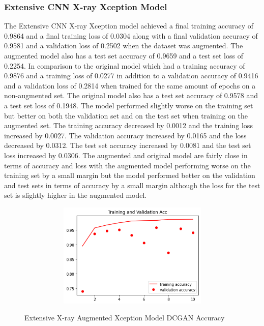 \subsubsection{Extensive CNN X-ray Xception Model}
The Extensive CNN X-ray Xception model achieved a final training accuracy of 0.9864 and a final training loss of 0.0304 along with a final validation accuracy of 0.9581 and a validation loss of 0.2502 when the dataset was augmented.  The augmented model also has a test set accuracy of 0.9659 and a test set loss of 0.2254.  In comparison to the original model which had a training accuracy of 0.9876 and a training loss of 0.0277 in addition to a validation accuracy of 0.9416 and a validation loss of 0.2814 when trained for the same amount of epochs on a non-augmented set.  The original model also has a test set accuracy of 0.9578 and a test set loss of 0.1948.  The model performed slightly worse on the training set but better on both the validation set and on the test set when training on the augmented set.  The training accuracy decreased by 0.0012 and the training loss increased by 0.0027. The validation accuracy increased by 0.0165 and the loss decreased by 0.0312.  The test set accuracy increased by 0.0081 and the test set loss increased by 0.0306. The augmented and original model are fairly close in terms of accuracy and loss with the augmented model performing worse on the training set by a small margin but the model performed better on the validation and test sets in terms of accuracy by a small margin although the loss for the test set is slightly higher in the augmented model.
 \begin{figure}[H]
    \centering    \includegraphics[width=1\textwidth,height=5cm,keepaspectratio]{Images/XceptionBaselineTrainingValidationAccuracyExtensiveXray.png}\\
    \caption{Extensive X-ray Augmented Xception Model DCGAN Accuracy}
    \label{fig:Extensive X-ray Augmented Xception Model DCGAN Accuracy}
\end{figure}
